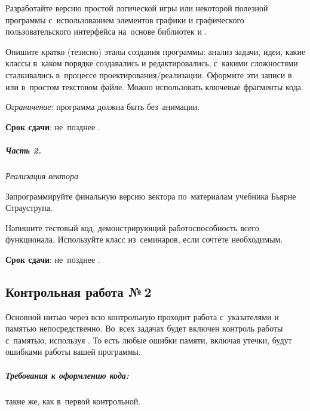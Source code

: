 \documentclass[a4paper,11pt,landscape,notitlepage,oneside,openany,final]{memoir}
\begin{document}
Разработайте версию простой логической игры или некоторой полезной программы с~использованием элементов графики и графического пользовательского интерфейса на~основе библиотек  и .

Опишите кратко (тезисно) этапы создания программы: анализ задачи, идеи, какие классы в~каком порядке создавались и редактировались, с~какими сложностями сталкивались в~процессе проектирования/реализации. Оформите эти записи в~\href{https://ru.wikipedia.org/wiki/Markdown}{} или в~простом текстовом файле. Можно использовать ключевые фрагменты кода.

\smallskip

\emph{Ограничение}: программа должна быть без~анимации.

\medskip

\textbf{Срок сдачи}: не~позднее .


\subparagraph{Часть 2.}
\textit{Реализация вектора}

Запрограммируйте финальную версию вектора по~материалам  учебника Бьярне Страуструпа.

Напишите тестовый код, демонстрирующий работоспособность всего функционала. Используйте класс  из~семинаров, если сочтёте необходимым.

\medskip

\textbf{Срок сдачи}: не~позднее .



\subsection{Контрольная работа №\,2}
Основной нитью через всю контрольную проходит работа с~указателями и памятью непосредственно. Во~всех задачах будет включен контроль работы с~памятью, используя . То есть любые ошибки памяти, включая утечки, будут ошибками работы вашей программы.

\subparagraph{Требования к оформлению кода:}
такие же, как в~первой контрольной.



\newenvironment{results}[1][0pt]{
    \phantom{top of the page}
    \vspace{0pt plus 1fill}

    \noindent\hspace{#1}
    \begin{minipage}{\dimexpr\textwidth-#1\relax}
}{
    \end{minipage}

    \vspace{0pt plus 1fill}
    \phantom{bottom of the page}
}
\end{document}
